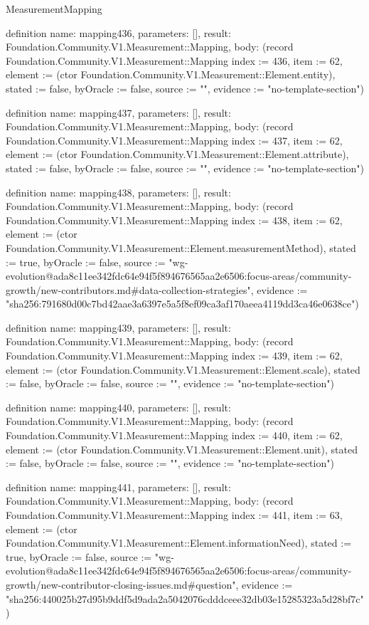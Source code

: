 \begin{lexlean}{MeasurementMapping}
\begin{semanticmodule}
definition{
  name: mapping436,
  parameters: [],
  result: Foundation.Community.V1.Measurement::Mapping,
  body: (record Foundation.Community.V1.Measurement::Mapping {index := 436, item := 62, element := (ctor Foundation.Community.V1.Measurement::Element.entity), stated := false, byOracle := false, source := "", evidence := "no-template-section"})
}

definition{
  name: mapping437,
  parameters: [],
  result: Foundation.Community.V1.Measurement::Mapping,
  body: (record Foundation.Community.V1.Measurement::Mapping {index := 437, item := 62, element := (ctor Foundation.Community.V1.Measurement::Element.attribute), stated := false, byOracle := false, source := "", evidence := "no-template-section"})
}

definition{
  name: mapping438,
  parameters: [],
  result: Foundation.Community.V1.Measurement::Mapping,
  body: (record Foundation.Community.V1.Measurement::Mapping {index := 438, item := 62, element := (ctor Foundation.Community.V1.Measurement::Element.measurementMethod), stated := true, byOracle := false, source := "wg-evolution@ada8c11ee342fdc64e94f5f894676565aa2e6506:focus-areas/community-growth/new-contributors.md#data-collection-strategies", evidence := "sha256:791680d00c7bd42aae3a6397e5a5f8ef09ca3af170aeea4119dd3ca46e0638ce"})
}

definition{
  name: mapping439,
  parameters: [],
  result: Foundation.Community.V1.Measurement::Mapping,
  body: (record Foundation.Community.V1.Measurement::Mapping {index := 439, item := 62, element := (ctor Foundation.Community.V1.Measurement::Element.scale), stated := false, byOracle := false, source := "", evidence := "no-template-section"})
}

definition{
  name: mapping440,
  parameters: [],
  result: Foundation.Community.V1.Measurement::Mapping,
  body: (record Foundation.Community.V1.Measurement::Mapping {index := 440, item := 62, element := (ctor Foundation.Community.V1.Measurement::Element.unit), stated := false, byOracle := false, source := "", evidence := "no-template-section"})
}

definition{
  name: mapping441,
  parameters: [],
  result: Foundation.Community.V1.Measurement::Mapping,
  body: (record Foundation.Community.V1.Measurement::Mapping {index := 441, item := 63, element := (ctor Foundation.Community.V1.Measurement::Element.informationNeed), stated := true, byOracle := false, source := "wg-evolution@ada8c11ee342fdc64e94f5f894676565aa2e6506:focus-areas/community-growth/new-contributor-closing-issues.md#question", evidence := "sha256:440025b27d95b9ddf5d9ada2a5042076cdddceee32db03e15285323a5d28bf7c"})
}


\end{semanticmodule}
\end{lexlean}
